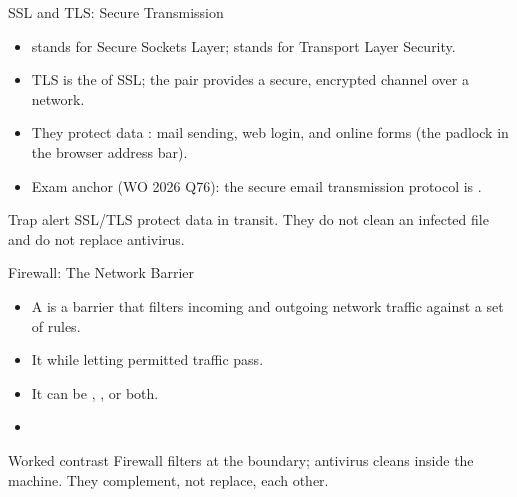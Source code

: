 \documentclass[aspectratio=169]{beamer}
\begin{document}
\begin{frame}{SSL and TLS: Secure Transmission}
  \begin{itemize}
    \item {} stands for Secure Sockets Layer;  stands for
      Transport Layer Security.
    \item TLS is the  of SSL; the pair provides a secure,
      encrypted channel over a network.
    \item They protect data : mail sending, web login, and
      online forms (the padlock in the browser address bar).
    \item Exam anchor (WO 2026 Q76): the secure email transmission protocol
      is .
  \end{itemize}
  \begin{alertblock}{Trap alert}
    SSL/TLS protect data in transit. They do not clean an infected file
    and do not replace antivirus.
  \end{alertblock}
\end{frame}

\begin{frame}{Firewall: The Network Barrier}
  \begin{itemize}
    \item A  is a barrier that filters incoming and outgoing
      network traffic against a set of rules.
    \item It  while letting permitted
      traffic pass.
    \item It can be , , or both.
    \item {}
  \end{itemize}
  \begin{exampleblock}{Worked contrast}
    Firewall filters  at the boundary; antivirus cleans
     inside the machine. They complement, not replace, each
    other.
  \end{exampleblock}
\end{frame}
\end{document}
